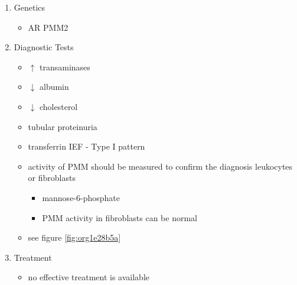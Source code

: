 \documentclass[12pt]{scrartcl}
\begin{document}
\begin{enumerate}
\begin{itemize}

\item GDP-mannose is used in the ER to assemble the dolichol-pyrophosphate
oligosaccharide precursor
\item defect leads to hypoglycosylation
\item deficiency and/or dysfunction of numerous glycoproteins:
\begin{itemize}
\item serum proteins:
\begin{itemize}
\item thyroxin-binding globulin, haptoglobin, clotting factor XI,
antithrombin III, cholinesterase
\end{itemize}
\item lysosomal enzymes
\item membrane bound glycoproteins
\end{itemize}
\end{itemize}

\item Genetics
\label{sec:orgc50d15d}
\begin{itemize}
\item AR PMM2
\end{itemize}

\item Diagnostic Tests
\label{sec:orgb9fcd62}
\begin{itemize}
\item \(\uparrow\) transaminases
\item \(\downarrow\) albumin
\item \(\downarrow\) cholesterol
\item tubular proteinuria
\item transferrin IEF - Type I pattern
\item activity of PMM should be measured to confirm the diagnosis
leukocytes or fibroblasts
\begin{itemize}
\item\relax [2-H\textsuperscript{3}]mannose-6-phosphate
\item PMM activity in fibroblasts can be normal
\end{itemize}
\item see figure \ref{fig:org1e28b5a}
\end{itemize}

\item Treatment
\label{sec:orgec50deb}
\begin{itemize}
\item no effective treatment is available
\end{itemize}
\end{enumerate}
\end{document}
